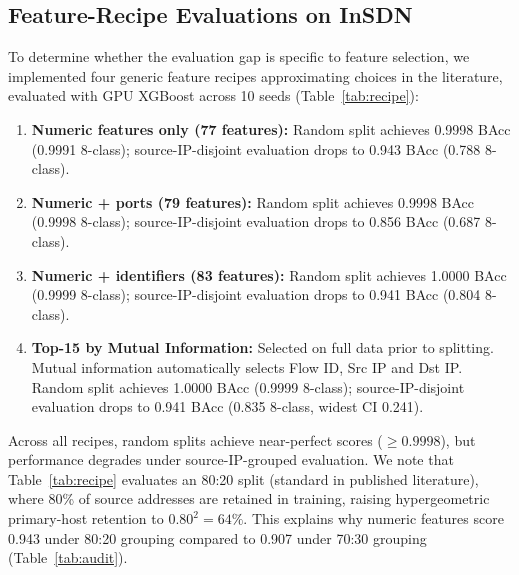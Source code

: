 \documentclass[journal]{IEEEtran}
\begin{document}
\subsection{Feature-Recipe Evaluations on InSDN}
To determine whether the evaluation gap is specific to feature selection, we implemented four generic feature recipes approximating choices in the literature, evaluated with GPU XGBoost across 10 seeds (Table~\ref{tab:recipe}):
\begin{enumerate}
    \item \textbf{Numeric features only (77 features):} Random split achieves 0.9998 BAcc (0.9991 8-class); source-IP-disjoint evaluation drops to 0.943 BAcc (0.788 8-class).
    \item \textbf{Numeric + ports (79 features):} Random split achieves 0.9998 BAcc (0.9998 8-class); source-IP-disjoint evaluation drops to 0.856 BAcc (0.687 8-class).
    \item \textbf{Numeric + identifiers (83 features):} Random split achieves 1.0000 BAcc (0.9999 8-class); source-IP-disjoint evaluation drops to 0.941 BAcc (0.804 8-class).
    \item \textbf{Top-15 by Mutual Information:} Selected on full data prior to splitting. Mutual information automatically selects Flow ID, Src IP and Dst IP. Random split achieves 1.0000 BAcc (0.9999 8-class); source-IP-disjoint evaluation drops to 0.941 BAcc (0.835 8-class, widest CI 0.241).
\end{enumerate}
Across all recipes, random splits achieve near-perfect scores ($\ge 0.9998$), but performance degrades under source-IP-grouped evaluation. We note that Table~\ref{tab:recipe} evaluates an 80:20 split (standard in published literature), where 80\% of source addresses are retained in training, raising hypergeometric primary-host retention to $0.80^2 = 64\%$. This explains why numeric features score 0.943 under 80:20 grouping compared to 0.907 under 70:30 grouping (Table~\ref{tab:audit}).
\end{document}

